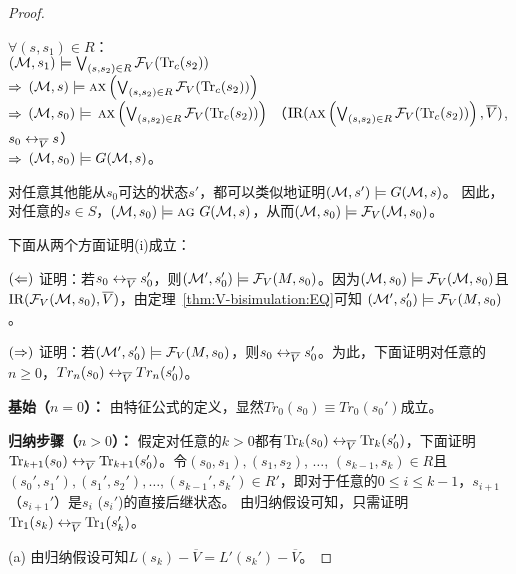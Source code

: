 \begin{proof}
\begin{itemize}
		$\forall (s, s_1) \in R$：\\
		$({\cal M}, s_1) \models \bigvee_{(s, s_2)\in R}{\cal F}_V(\textrm{Tr}_c(s_2))$\\
		$\Rightarrow$ $({\cal M}, s) \models \textsc{a} \textsc{x} \left( \bigvee_{(s, s_2)\in R} {\cal F}_V(\textrm{Tr}_c(s_2)) \right)$ \\
		$\Rightarrow$ $({\cal M}, s_0) \models$  $\textsc{a} \textsc{x} \left( \bigvee_{(s, s_2)\in R} {\cal F}_V(\textrm{Tr}_c(s_2)) \right)$   \hfill   （$\textrm{IR}(\textsc{a} \textsc{x} \left( \bigvee_{(s, s_2)\in R} {\cal F}_V(\textrm{Tr}_c(s_2)) \right), \overline V)$, $s_0 \leftrightarrow_{\overline V} s$）\\
		$\Rightarrow$ $({\cal M}, s_0) \models G({\cal M}, s)$。\\
	\end{itemize}
	
	对任意其他能从$s_0$可达的状态$s'$，都可以类似地证明$({\cal M},s')\models G({\cal M}, s)$。
	因此，对任意的$s\in S$，$({\cal M}, s_0) \models \textsc{a}\textsc{g}\ G({\cal M}, s)$，从而$({\cal M}, s_0) \models {\cal F}_V({\cal M}, s_0)$。
	
	下面从两个方面证明(i)成立：
	
	$(\Leftarrow)$ 证明：若$s_0 \leftrightarrow_{\overline V} s_0'$，则$({\cal M}',s_0') \models {\cal F}_V(M,s_0)$。因为$({\cal M}, s_0) \models {\cal F}_V({\cal M}, s_0)$且 $\textrm{IR}({\cal F}_V({\cal M}, s_0), \overline V)$，由定理~\ref{thm:V-bisimulation:EQ}可知
	$({\cal M}',s_0') \models {\cal F}_V(M,s_0)$。
	
	$(\Rightarrow)$ 证明：若$({\cal M}',s_0') \models {\cal F}_V(M,s_0)$，则$s_0 \leftrightarrow_{\overline V} s_0'$。为此，下面证明对任意的$n \geq 0$，$Tr_n(s_0) \leftrightarrow_{\overline V} Tr_n(s_0')$。
	
	
	\textbf{基始（$n=0$）：} 由特征公式的定义，显然$Tr_0(s_0) \equiv Tr_0(s_0')$成立。
	
	\textbf{归纳步骤（$n>0$）：} 假定对任意的$k > 0$都有$\textrm{Tr}_k(s_0) \leftrightarrow_{\overline V} \textrm{Tr}_k(s_0')$，下面证明$\textrm{Tr}_{k+1}(s_0) \leftrightarrow_{\overline V} \textrm{Tr}_{k+1}(s_0')$。令$(s_0, s_1), (s_1, s_2)$, $\dots$, $(s_{k-1}, s_k) \in R$且$(s_0', s_1'), (s_1', s_2'), \dots, (s_{k-1}', s_k') \in R'$，即对于任意的$0 \leq i \leq k-1$，$s_{i+1}$（$s_{i+1}'$）是$s_i$ ($s_i'$)的直接后继状态。
	由归纳假设可知，只需证明$\textrm{Tr}_1(s_k) \leftrightarrow_{\overline V} \textrm{Tr}_1(s_k')$。
	
	(a) 由归纳假设可知$L(s_k) - \overline V = L'(s_k') - \overline V$。
	

\end{proof}
